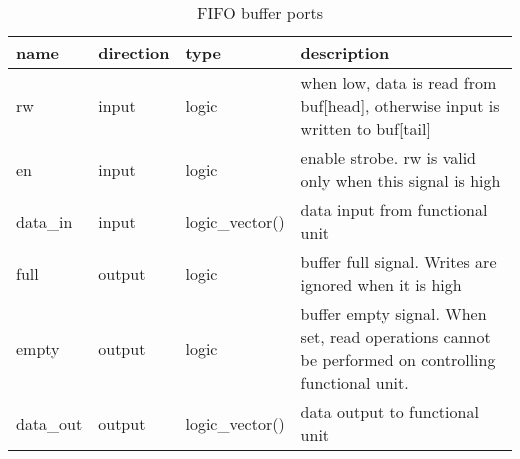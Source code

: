 	\FloatBarrier
	
	\begin{table}[!htb]
		\begin{tabular}{| l| l | l | p{8cm} |}
			\hline
			\textbf{name} & \textbf{direction} & \textbf{type} &  \textbf{description}\\ \hline
			rw & input & logic & when low, data is read from buf[head], otherwise input is written to buf[tail]\\ \hline
			en & input & logic & enable strobe. rw is valid only when this signal is high \\ \hline
			data\_in & input & logic\_vector(\dataW) & data input from functional unit \\ \hline
			full & output & logic & buffer full signal. Writes are ignored when it is high \\ \hline
			empty & output & logic & buffer empty signal. When set, read operations cannot be performed on controlling functional unit. \\ \hline
			data\_out & output & logic\_vector(\dataW) & data output to functional unit \\ \hline
		\end{tabular}
		\label{table:out_buffer_description}
		\caption{FIFO buffer ports}
		\centering
	\end{table}